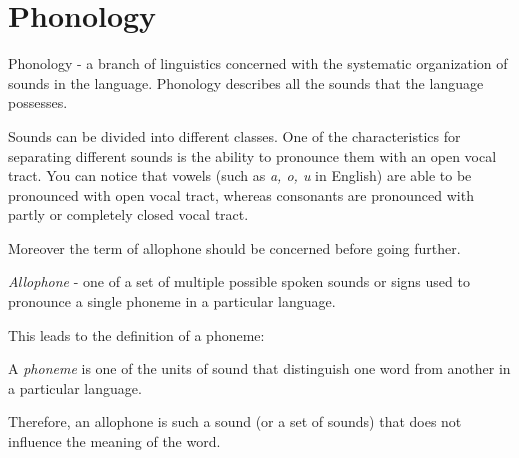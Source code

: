 \chapter{Phonology}

Phonology - a branch of linguistics concerned with the systematic organization of sounds in the language. Phonology describes all the sounds that the language possesses.

Sounds can be divided into different classes. One of the characteristics for separating different sounds is the ability to pronounce them with an open vocal tract. You can notice that vowels (such as \textit{a, o, u} in English) are able to be pronounced with open vocal tract, whereas consonants are pronounced with partly or completely closed vocal tract.

Moreover the term of allophone should be concerned before going further.

\textit{Allophone} - one of a set of multiple possible spoken sounds or signs used to pronounce a single phoneme in a particular language.

This leads to the definition of a phoneme:

A \textit{phoneme} is one of the units of sound that distinguish one word from another in a particular language.

Therefore, an allophone is such a sound (or a set of sounds) that does not influence the meaning of the word. 









